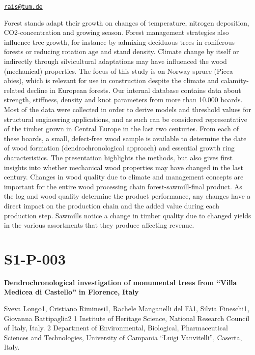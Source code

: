 \documentclass[
]{book}
\begin{document}
\href{mailto:rais@tum.de}{\nolinkurl{rais@tum.de}}

Forest stands adapt their growth on changes of temperature, nitrogen
deposition, CO2-concentration and growing season. Forest management
strategies also influence tree growth, for instance by admixing
deciduous trees in coniferous forests or reducing rotation age and stand
density. Climate change by itself or indirectly through silvicultural
adaptations may have influenced the wood (mechanical) properties. The
focus of this study is on Norway spruce (Picea abies), which is relevant
for use in construction despite the climate and calamity-related decline
in European forests. Our internal database contains data about strength,
stiffness, density and knot parameters from more than 10.000 boards.
Most of the data were collected in order to derive models and threshold
values for structural engineering applications, and as such can be
considered representative of the timber grown in Central Europe in the
last two centuries. From each of these boards, a small, defect-free wood
sample is available to determine the date of wood formation
(dendrochronological approach) and essential growth ring
characteristics. The presentation highlights the methods, but also gives
first insights into whether mechanical wood properties may have changed
in the last century. Changes in wood quality due to climate and
management concepts are important for the entire wood processing chain
forest-sawmill-final product. As the log and wood quality determine the
product performance, any changes have a direct impact on the production
chain and the added value during each production step. Sawmills notice a
change in timber quality due to changed yields in the various
assortments that they produce affecting revenue.

\hypertarget{s1-p-003}{%
\section*{S1-P-003}\label{s1-p-003}}

\textbf{Dendrochronological investigation of monumental trees from ``Villa
Medicea di Castello'' in Florence, Italy}

Sveva Longo1, Cristiano Riminesi1, Rachele Manganelli del Fà1, Silvia
Fineschi1, Giovanna Battipaglia2 1 Institute of Heritage Science,
National Research Council of Italy, Italy. 2 Department of
Environmental, Biological, Pharmaceutical Sciences and Technologies,
University of Campania ``Luigi Vanvitelli'', Caserta, Italy.
\end{document}

